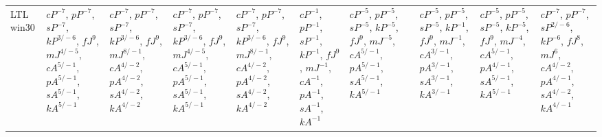 \documentclass[letterpaper]{article} %
\begin{document}
\begin{sidewaystable*}
\begin{tabular}{l l l l l l l l l l l }
\multirow{10}{1.7cm}{LTL win30} & \multirow{10}{1.7cm}{$cP^{-7}$, $pP^{-7}$, $sP^{-7}$, $kP^{3/-6}$, $fJ^{9}$, $mJ^{4/-5}$, $cA^{5/-1}$, $pA^{5/-1}$, $sA^{5/-1}$, $kA^{5/-1}$} & \multirow{10}{1.7cm}{$cP^{-7}$, $pP^{-7}$, $sP^{-7}$, $kP^{3/-6}$, $fJ^{9}$, $mJ^{8/-1}$, $cA^{4/-2}$, $pA^{4/-2}$, $sA^{4/-2}$, $kA^{4/-2}$} & \multirow{10}{1.7cm}{$cP^{-7}$, $pP^{-7}$, $sP^{-7}$, $kP^{3/-6}$, $fJ^{9}$, $mJ^{4/-5}$, $cA^{5/-1}$, $pA^{5/-1}$, $sA^{5/-1}$, $kA^{5/-1}$} & \multirow{10}{1.7cm}{$cP^{-7}$, $pP^{-7}$, $sP^{-7}$, $kP^{3/-6}$, $fJ^{9}$, $mJ^{8/-1}$, $cA^{4/-2}$, $pA^{4/-2}$, $sA^{4/-2}$, $kA^{4/-2}$} & \multirow{10}{1.7cm}{$cP^{-1}$, $pP^{-1}$, $sP^{-1}$, $kP^{-1}$, $fJ^{9}$, $mJ^{-1}$, $cA^{-1}$, $pA^{-1}$, $sA^{-1}$, $kA^{-1}$} & \multirow{10}{1.7cm}{$cP^{-5}$, $pP^{-5}$, $sP^{-5}$, $kP^{-5}$, $fJ^{9}$, $mJ^{-5}$, $cA^{5/-1}$, $pA^{5/-1}$, $sA^{5/-1}$, $kA^{5/-1}$} & \multirow{10}{1.7cm}{} & \multirow{10}{1.7cm}{$cP^{-5}$, $pP^{-5}$, $sP^{-5}$, $kP^{-1}$, $fJ^{9}$, $mJ^{-1}$, $cA^{3/-1}$, $pA^{3/-1}$, $sA^{3/-1}$, $kA^{3/-1}$} & \multirow{10}{1.7cm}{$cP^{-5}$, $pP^{-5}$, $sP^{-5}$, $kP^{-5}$, $fJ^{9}$, $mJ^{-4}$, $cA^{5/-1}$, $pA^{4/-1}$, $sA^{5/-1}$, $kA^{5/-1}$} & \multirow{10}{1.7cm}{$cP^{-7}$, $pP^{-7}$, $sP^{2/-6}$, $kP^{-6}$, $fJ^{8}$, $mJ^{6}$, $cA^{4/-2}$, $pA^{4/-1}$, $sA^{4/-2}$, $kA^{4/-1}$} \\ \\ \\ \\ \\ \\ \\ \\ \\ \\
\midrule

\end{tabular}
\end{sidewaystable*}
\end{document}
